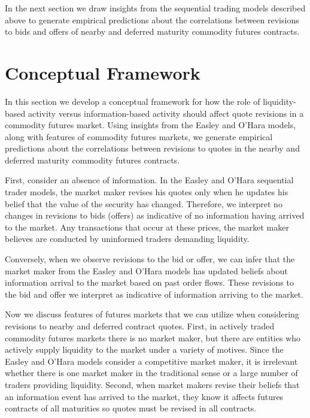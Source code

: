 \documentclass[]{elsarticle} %
\begin{document}
In the next section we draw insights from the sequential trading models
described above to generate empirical predictions about the correlations
between revisions to bids and offers of nearby and deferred maturity
commodity futures contracts.

\section{Conceptual Framework}\label{conceptual-framework}

In this section we develop a conceptual framework for how the role of
liquidity-based activity versus information-based activity should affect
quote revisions in a commodity futures market. Using insights from the
Easley and O'Hara models, along with features of commodity futures
markets, we generate empirical predictions about the correlations
between revisions to quotes in the nearby and deferred maturity
commodity futures contracts.

First, consider an absence of information. In the Easley and O'Hara
sequential trader models, the market maker revises his quotes only when
he updates his belief that the value of the security has changed.
Therefore, we interpret no changes in revisions to bids (offers) as
indicative of no information having arrived to the market. Any
transactions that occur at these prices, the market maker believes are
conducted by uninformed traders demanding liquidity.

Conversely, when we observe revisions to the bid or offer, we can infer
that the market maker from the Easley and O'Hara models has updated
beliefs about information arrival to the market based on past order
flows. These revisions to the bid and offer we interpret as indicative
of information arriving to the market.

Now we discuss features of futures markets that we can utilize when
considering revisions to nearby and deferred contract quotes. First, in
actively traded commodity futures markets there is no market maker, but
there are entities who actively supply liquidity to the market under a
variety of motives. Since the Easley and O'Hara models consider a
competitive market maker, it is irrelevant whether there is one market
maker in the traditional sense or a large number of traders providing
liquidity. Second, when market makers revise their beliefs that an
information event has arrived to the market, they know it affects
futures contracts of all maturities so quotes must be revised in all
contracts.
\end{document}
